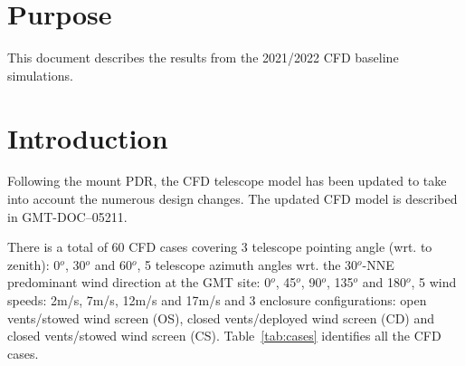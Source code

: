 \section{Purpose}
\label{sec:purpose}

This document describes the results from the 2021/2022 CFD baseline simulations.

\section{Introduction}

Following the mount PDR\cite{MOUNT-PDR}, the CFD telescope model has been updated to take
into account the numerous design changes.
The updated CFD model is described in GMT-DOC--05211\cite{GMT.DOC.05211}.

There is a total of 60 CFD cases covering 3 telescope pointing angle (wrt. to zenith): 0$^o$, 30$^o$ and 60$^o$, 5 telescope azimuth angles wrt. 
the 30$^o$-NNE predominant wind direction at the GMT site: 0$^o$, 45$^o$, 90$^o$, 135$^o$ and 180$^o$, 5 wind speeds: 2m/s, 7m/s, 12m/s and 17m/s and 
3 enclosure configurations: open vents/stowed wind screen (OS), closed vents/deployed wind screen (CD) and closed vents/stowed wind screen (CS).
Table~\ref{tab:cases} identifies all the CFD cases.
